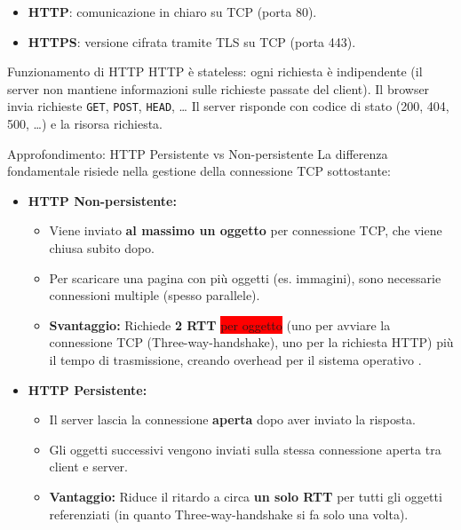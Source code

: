 \documentclass[a4paper,12pt]{report}
\begin{document}
\begin{itemize}
    \item \textbf{HTTP}: comunicazione in chiaro su TCP (porta 80).
    \item \textbf{HTTPS}: versione cifrata tramite TLS su TCP (porta 443).
\end{itemize}

\begin{defbox}{Funzionamento di HTTP}
HTTP è stateless: ogni richiesta è indipendente (il server non mantiene informazioni sulle richieste
passate del client).  
Il browser invia richieste \texttt{GET}, \texttt{POST}, \texttt{HEAD}, …  
Il server risponde con codice di stato (200, 404, 500, …) e la risorsa richiesta.
\end{defbox}




\begin{notebox}{Approfondimento: HTTP Persistente vs Non-persistente}
    La differenza fondamentale risiede nella gestione della connessione TCP sottostante:

    \begin{itemize}
        \item \textbf{HTTP Non-persistente:} 
        \begin{itemize}
            \item Viene inviato \textbf{al massimo un oggetto} per connessione TCP, che viene chiusa subito dopo.
            \item Per scaricare una pagina con più oggetti (es. immagini), sono necessarie connessioni multiple (spesso parallele).
            \item \textbf{Svantaggio:} Richiede \textbf{2 RTT} \colorbox{red}{per oggetto} (uno per avviare la connessione TCP (Three-way-handshake), uno per la richiesta HTTP) più il tempo di trasmissione, creando overhead per il sistema operativo .
        \end{itemize}
        
        \item \textbf{HTTP Persistente:}
        \begin{itemize}
            \item Il server lascia la connessione \textbf{aperta} dopo aver inviato la risposta.
        \item Gli oggetti successivi vengono inviati sulla stessa connessione aperta tra client e server.
            \item \textbf{Vantaggio:} Riduce il ritardo a circa \textbf{un solo RTT} per tutti gli oggetti referenziati (in quanto Three-way-handshake si fa solo una volta).
        \end{itemize}
    \end{itemize}
\end{notebox}
\end{document}
